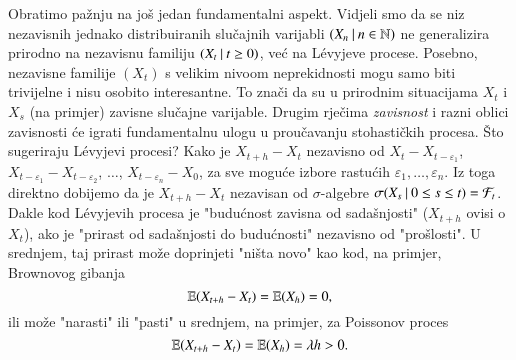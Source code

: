 \begin{nap} \label{nap:21.16}
    Obratimo pa\v znju na jo\v s jedan fundamentalni aspekt.
    Vidjeli smo da se niz nezavisnih jednako distribuiranih slu\v cajnih varijabli $({X_n} \: | \: {n \in \mathbb{N}})$ ne generalizira prirodno na nezavisnu familiju $({X_t} \: | \: {t \geq 0})$, ve\' c na L\' evyjeve procese.
    Posebno,
    nezavisne familije $(X_t)$ s velikim nivoom neprekidnosti mogu samo biti trivijelne i nisu osobito interesantne.
    To zna\v ci da su u prirodnim situacijama $X_t$ i $X_s$ (na primjer) zavisne slu\v cajne varijable.
    Drugim rje\v cima \emph{zavisnost} i razni oblici zavisnosti \' ce igrati fundamentalnu ulogu u prou\v cavanju stohasti\v ckih procesa.
    \v Sto sugeriraju L\' evyjevi procesi?
    Kako je $X_{t + h} - X_t$ nezavisno od $X_t - X_{t - \varepsilon_1}$, $X_{t - \varepsilon_1} - X_{t - \varepsilon_2}$, $\ldots$, $X_{t - \varepsilon_n} - X_0$, za sve mogu\' ce izbore rastu\' cih $\varepsilon_1, \ldots, \varepsilon_n$.
    Iz toga direktno dobijemo da je $X_{t + h} - X_t$ nezavisan od $\sigma$-algebre $\sigma({X_s} \: | \: {0 \leq s \leq t}) = \mathcal{F}_t$.
    Dakle kod L\' evyjevih procesa je "budu\' cnost zavisna od sada\v snjosti" ($X_{t + h}$ ovisi o $X_t$), ako je "prirast od sada\v snjosti do budu\' cnosti" nezavisno od "pro\v slosti".
    U srednjem, taj prirast mo\v ze doprinjeti "ni\v sta novo" kao kod, na primjer, Brownovog gibanja
    \begin{equation*}
        \mathbb{E} (X_{t + h} - X_t) = \mathbb{E} (X_h) = 0,
    \end{equation*}
    ili mo\v ze "narasti" ili "pasti" u srednjem, na primjer, za Poissonov proces
    \begin{equation*}
        \mathbb{E} (X_{t + h} - X_t) = \mathbb{E} (X_h) = \lambda h > 0.
    \end{equation*}
\end{nap}
